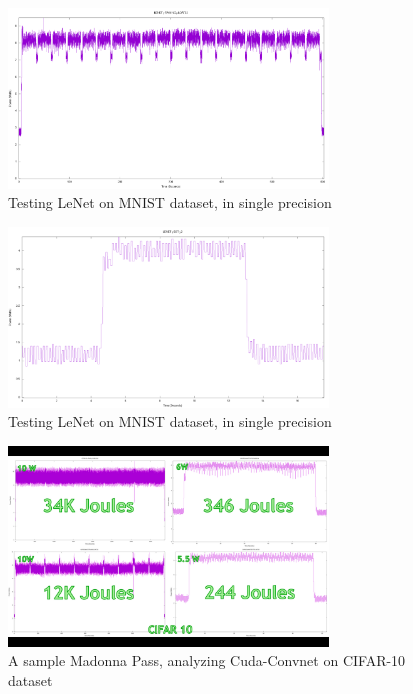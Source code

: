 \documentclass[letterpaper, 10 pt, conference]{ieeeconf}
\begin{document}
          \begin{figure}[h]
              \centering
              \includegraphics[width=85mm,scale=1]{lenet_train_single.png}
              \caption{Testing LeNet on MNIST dataset, in single precision}
              \label{lenet_train_single}
          \end{figure}
          
          \begin{figure}[h]
              \centering
              \includegraphics[width=85mm,scale=1]{lenet_test_single.png}
              \caption{Testing LeNet on MNIST dataset, in single precision}
              \label{lenet_test_single}
          \end{figure}
          
          \begin{figure}[h]
              \centering
              \includegraphics[width=85mm,scale=1]{cifar10.png}
              \caption{A sample Madonna Pass, analyzing Cuda-Convnet on CIFAR-10 dataset}
              \label{fig:cifar}
          \end{figure}
          
\end{document}

